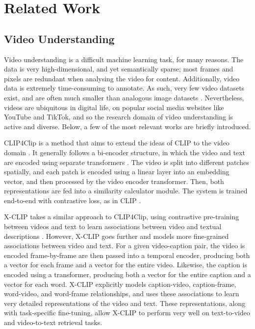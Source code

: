 \section{Related Work}

\subsection{Video Understanding}

Video understanding is a difficult machine learning task, for many reasons.
The data is very high-dimensional, and yet semantically sparse; most frames and pixels are redundant when analysing the video for content.
Additionally, video data is extremely time-consuming to annotate.
As such, very few video datasets exist, and are often much smaller than analogous image datasets \cite{imagenet} \cite{COCO}.
Nevertheless, videos are ubiquitous in digital life, on popular social media websites like YouTube and TikTok, and so the research domain of video understanding is active and diverse.
Below, a few of the most relevant works are briefly introduced.

CLIP4Clip is a method that aims to extend the ideas of CLIP \cite{clip} to the video domain \cite{clip4clip}.
It generally follows a bi-encoder structure, in which the video and text are encoded using separate transformers \cite{transformer}.
The video is split into different patches spatially, and each patch is encoded using a linear layer into an embedding vector, and then processed by the video encoder transformer.
Then, both representations are fed into a similarity calculator module.
The system is trained end-to-end with contrastive loss, as in CLIP \cite{clip}.

X-CLIP takes a similar approach to CLIP4Clip, using contrastive pre-training between videos and text to learn associations between video and textual descriptions \cite{xclip}.
However, X-CLIP goes further and models more fine-grained associations between video and text.
For a given video-caption pair, the video is encoded frame-by-frame are then passed into a temporal encoder, producing both a vector for each frame and a vector for the entire video.
Likewise, the caption is encoded using a transformer, producing both a vector for the entire caption and a vector for each word.
X-CLIP explicitly models caption-video, caption-frame, word-video, and word-frame relationships, and uses these associations to learn very detailed representations of the video and text.
These representations, along with task-specific fine-tuning, allow X-CLIP to perform very well on text-to-video and video-to-text retrieval tasks.

